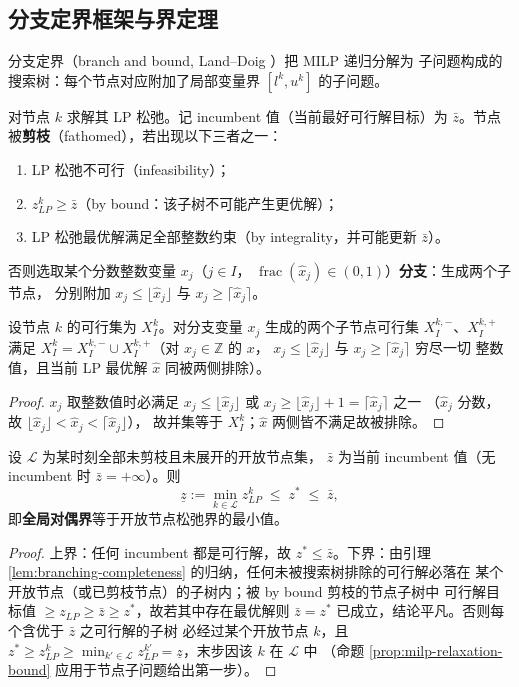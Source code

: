 \subsection{分支定界框架与界定理}
\label{subsec:bnb}

分支定界（branch and bound, Land--Doig \cite{landdoig1960}）把 MILP 递归分解为
子问题构成的搜索树：每个节点对应附加了局部变量界 $[l^k, u^k]$ 的子问题。

\begin{definition}[节点处理与剪枝]
对节点 $k$ 求解其 LP 松弛。记 incumbent 值（当前最好可行解目标）为
$\bar z$。节点被\textbf{剪枝}（fathomed），若出现以下三者之一：
\begin{enumerate}
  \item LP 松弛不可行（infeasibility）；
  \item $z_{LP}^k \ge \bar z$（by bound：该子树不可能产生更优解）；
  \item LP 松弛最优解满足全部整数约束（by integrality，并可能更新
        $\bar z$）。
\end{enumerate}
否则选取某个分数整数变量 $x_j$（$j \in I$，
$\operatorname{frac}(\hat x_j) \in (0,1)$）\textbf{分支}：生成两个子节点，
分别附加 $x_j \le \lfloor \hat x_j \rfloor$ 与
$x_j \ge \lceil \hat x_j \rceil$。
\end{definition}

\begin{lemma}[分支完备性]
\label{lem:branching-completeness}
设节点 $k$ 的可行集为 $X_I^k$。对分支变量 $x_j$ 生成的两个子节点可行集
$X_I^{k,-}$、$X_I^{k,+}$ 满足
$X_I^k = X_I^{k,-} \cup X_I^{k,+}$（对 $x_j \in \mathbb{Z}$ 的 $x$，
$x_j \le \lfloor\hat x_j\rfloor$ 与 $x_j \ge \lceil\hat x_j\rceil$ 穷尽一切
整数值，且当前 LP 最优解 $\hat x$ 同被两侧排除）。
\end{lemma}
\begin{proof}
$x_j$ 取整数值时必满足 $x_j \le \lfloor\hat x_j\rfloor$ 或
$x_j \ge \lfloor\hat x_j\rfloor + 1 = \lceil\hat x_j\rceil$ 之一
（$\hat x_j$ 分数，故 $\lfloor\hat x_j\rfloor < \hat x_j < \lceil\hat x_j\rfloor$），
故并集等于 $X_I^k$；$\hat x$ 两侧皆不满足故被排除。
\end{proof}

\begin{theorem}[界定理]
\label{thm:bnb-bound}
设 $\mathcal{L}$ 为某时刻全部未剪枝且未展开的开放节点集，
$\bar z$ 为当前 incumbent 值（无 incumbent 时 $\bar z = +\infty$）。则
\[
\underline z := \min_{k \in \mathcal{L}} z_{LP}^k \;\le\; z^* \;\le\; \bar z,
\]
即\textbf{全局对偶界}等于开放节点松弛界的最小值。
\end{theorem}
\begin{proof}
上界：任何 incumbent 都是可行解，故 $z^* \le \bar z$。下界：由引理
\ref{lem:branching-completeness} 的归纳，任何未被搜索树排除的可行解必落在
某个开放节点（或已剪枝节点）的子树内；被 by bound 剪枝的节点子树中
可行解目标值 $\ge z_{LP} \ge \bar z \ge z^*$，故若其中存在最优解则
$\bar z = z^*$ 已成立，结论平凡。否则每个含优于 $\bar z$ 之可行解的子树
必经过某个开放节点 $k$，且 $z^* \ge z_{LP}^k \ge \min_{k' \in \mathcal{L}}
z_{LP}^{k'} = \underline z$，末步因该 $k$ 在 $\mathcal{L}$ 中
（命题 \ref{prop:milp-relaxation-bound} 应用于节点子问题给出第一步）。
\end{proof}

